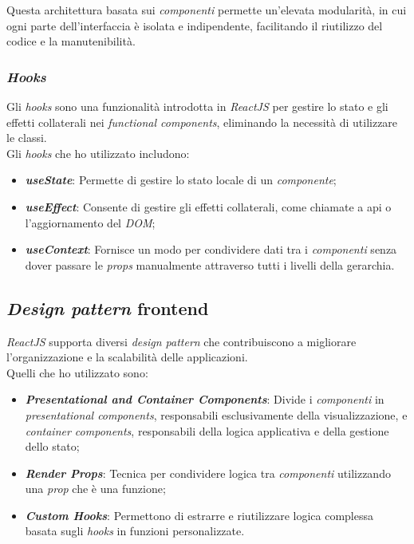 \noindent Questa architettura basata sui \textit{componenti} permette un'elevata modularità, in cui ogni parte dell'interfaccia è isolata e indipendente, facilitando il riutilizzo del codice e la manutenibilità.

\subsubsection{\textit{Hooks}}

Gli \textit{hooks} sono una funzionalità introdotta in \textit{ReactJS} per gestire lo stato e gli effetti collaterali nei \textit{functional components}, eliminando la necessità di utilizzare le classi.\\

\noindent Gli \textit{hooks} che ho utilizzato includono:
\begin{itemize}
    \item \textbf{\textit{useState}}: Permette di gestire lo stato locale di un \textit{componente};
    \item \textbf{\textit{useEffect}}: Consente di gestire gli effetti collaterali, come chiamate a \gls{api} o l'aggiornamento del \textit{DOM};
    \item \textbf{\textit{useContext}}: Fornisce un modo per condividere dati tra i \textit{componenti} senza dover passare le \textit{props} manualmente attraverso tutti i livelli della gerarchia.
\end{itemize}

\subsection*{\textit{Design pattern} frontend}

\textit{ReactJS} supporta diversi \textit{design pattern} che contribuiscono a migliorare l'organizzazione e la scalabilità delle applicazioni. \\
Quelli che ho utilizzato sono:
\begin{itemize}
    \item \textbf{\textit{Presentational and Container Components}}: Divide i \textit{componenti} in \textit{presentational components}, responsabili esclusivamente della visualizzazione, e \textit{container components}, responsabili della logica applicativa e della gestione dello stato;
    \item \textbf{\textit{Render Props}}: Tecnica per condividere logica tra \textit{componenti} utilizzando una \textit{prop} che è una funzione;
    \item \textbf{\textit{Custom Hooks}}: Permettono di estrarre e riutilizzare logica complessa basata sugli \textit{hooks} in funzioni personalizzate.
\end{itemize}


